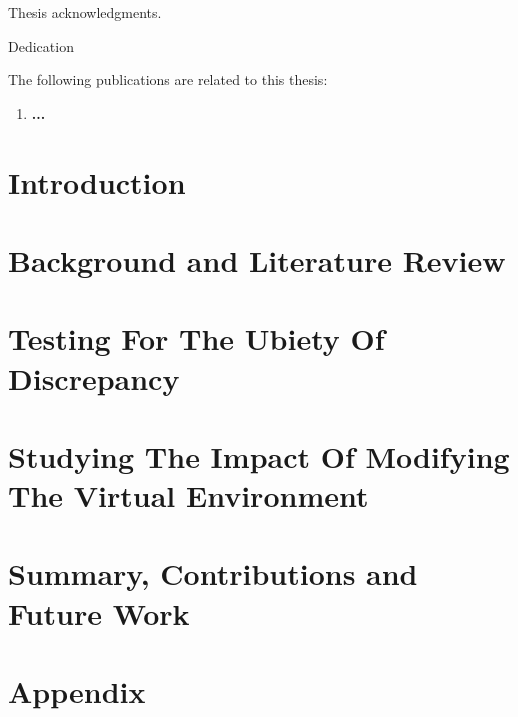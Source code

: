 \documentclass[12pt]{report}
\begin{document}
\begin{acknowledgments}

Thesis acknowledgments.

\end{acknowledgments}

\begin{dedication}
	
	Dedication
	
\end{dedication}

\begin{publications}

The following publications are related to this thesis:

\begin{enumerate}

\item \textbf{...} 

\end{enumerate}

\end{publications}

\chapter{Introduction}
\label{introduction}


\chapter{Background and Literature Review}
\label{background_and_literature_review}


\chapter{Testing For The Ubiety Of Discrepancy}
\label{chapter3}


\chapter{Studying The Impact Of Modifying The Virtual Environment}
\label{chapter4}


\chapter{Summary, Contributions and Future Work}
\label{conclusion}


\chapter{Appendix}
\label{appendix}


  

\end{document}
